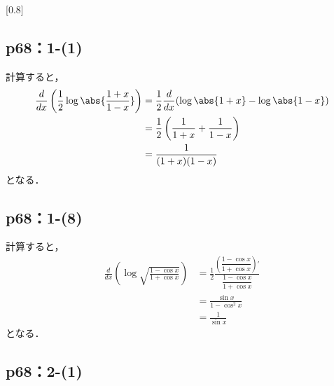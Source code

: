 \documentclass[uplatex,dvipdfmx,a4paper,10pt,fleqn]{jsarticle}
\begin{document}
\scalebox{0.8}[0.8]{
}

\subsection*{p68：1-(1)}

\begin{tleftbar}
    計算すると，
    \begin{align*} 
        \frac{d}{dx} \left ( \frac{1}{2} \log \abs{\frac{1+x}{1-x}} \right) & =\frac{1}{2} \frac{d}{dx} (\log  \abs{1+x}- \log \abs{1-x} ) \\
        & = \frac{1}{2} \left (\frac{1}{1+x}+\frac{1}{1-x} \right ) \\
        & = \frac{1}{(1+x)(1-x)}
    \end{align*} 
    となる．
\end{tleftbar}


\subsection*{p68：1-(8)}

\begin{tleftbar}
    計算すると，
    \begin{align*} 
       \frac{d}{dx} \left ( \log \sqrt{\frac{1-\cos x}{1+\cos x}} \right) & = \frac{1}{2} \frac{\left (\dfrac{1-\cos x}{1+\cos x} \right)'}{ \dfrac{1-\cos x}{1+\cos x} } \\
       & = \frac{\sin x}{1-\cos ^2 x}\\
       & = \frac{1}{\sin x}
    \end{align*}
    となる．
\end{tleftbar}


\subsection*{p68：2-(1)}
\end{document}
